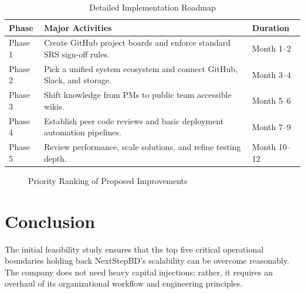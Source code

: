 \documentclass[12pt,a4paper]{report}
\begin{document}
\begin{table}[H]
\centering
\renewcommand{\arraystretch}{1.3}
\begin{tabularx}{\textwidth}{|p{3cm}|X|p{3cm}|}
\hline
\rowcolor{secondary}
\textbf{Phase} & \textbf{Major Activities} & \textbf{Duration} \\
\hline
Phase 1 & Create GitHub project boards and enforce standard SRS sign-off rules. & Month 1--2 \\
\hline
Phase 2 & Pick a unified system ecosystem and connect GitHub, Slack, and storage. & Month 3--4 \\
\hline
Phase 3 & Shift knowledge from PMs to public team accessible wikis. & Month 5--6 \\
\hline
Phase 4 & Establish peer code reviews and basic deployment automation pipelines. & Month 7--9 \\
\hline
Phase 5 & Review performance, scale solutions, and refine testing depth. & Month 10--12 \\
\hline
\end{tabularx}
\caption{Detailed Implementation Roadmap}
\end{table}

\begin{figure}[H]
\centering
{}
\caption{Priority Ranking of Proposed Improvements}
\end{figure}

\section{Conclusion}

The initial feasibility study ensures that the top five critical operational boundaries holding back NextStepBD's scalability can be overcome reasonably. The company does not need heavy capital injections; rather, it requires an overhaul of its organizational workflow and engineering principles.
\end{document}
